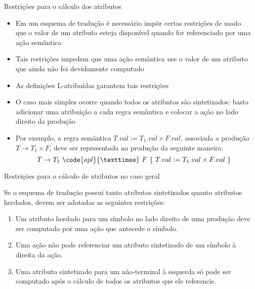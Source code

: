 \begin{frame}[fragile]{Restrições para o cálculo dos atributos}

    \begin{itemize}
        \item Em um esquema de tradução é necessário impôr certas restrições de modo que o valor de um atributo esteja disponível quando for referenciado por uma
            ação semântica

        \item Tais restrições impedem que uma ação semântica use o valor de um atributo que ainda não foi devidamente computado

        \item As definições L-atribuídas garantem tais restrições

        \item O caso mais simples ocorre quando todos os atributos são sintetizados: basta adicionar uma atribuição a cada regra semântica e colocar a ação no 
            lado direito da produção

        \item Por exemplo, a regra semântica $T.val := T_1.val\times F.val$, associada a produção $T\to T_1\times F$, deve ser representada na produção da
            seguinte maneira:
        \[
            T\to T_1\ \code{apl}{×}\ F\ \{\ T.val := T_1.val \times F.val\ \}
        \]
    \end{itemize}

\end{frame}

\begin{frame}[fragile]{Restrições para o cálculo de atributos no caso geral}

    Se o esquema de tradução possui tanto atributos sintetizados quanto atributos herdados, devem ser adotadas as seguintes restrições:
    \vspace{0.1in}
    \begin{enumerate}
        \item Um atributo herdado para um símbolo no lado direito de uma produção deve ser computado por uma ação que antecede o símbolo.
        \item Uma ação não pode referenciar um atributo sintetizado de um símbolo à direita da ação.
        \item Uma atributo sintetizado para um não-terminal à esquerda só pode ser computado após o cálculo de todos os atributos que ele referencie.
    \end{enumerate}

\end{frame}

